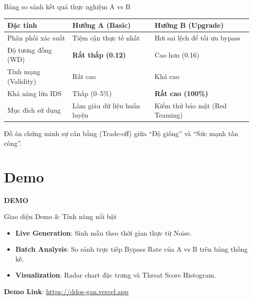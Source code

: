 \documentclass[aspectratio=169,11pt]{beamer}
\begin{document}
\begin{frame}{Bảng so sánh kết quả thực nghiệm A vs B}
  \centering \footnotesize
  \begin{tabular}{lll}
    \toprule
    \textbf{Đặc tính} &
    \textbf{Hướng A (Basic)} &
    \textbf{Hướng B (Upgrade)} \\
    \midrule
    Phân phối xác suất  & Tiệm cận thực tế nhất
                         & Hơi sai lệch để tối ưu bypass \\
    Độ tương đồng (WD)  & \textcolor{success}{\textbf{Rất thấp (0.12)}}
                         & Cao hơn (0.16) \\
    Tính mạng (Validity)& Rất cao     & Khá cao \\
    Khả năng lừa IDS    & Thấp (0--5\%)
                         & \textcolor{danger}{\textbf{Rất cao (100\%)}} \\
    Mục đích sử dụng    & Làm giàu dữ liệu huấn luyện
                         & Kiểm thử bảo mật (Red Teaming) \\
    \bottomrule
  \end{tabular}
  \vspace{10pt}
  \small Đồ án chứng minh sự cân bằng (Trade-off) giữa
  ``Độ giống'' và ``Sức mạnh tấn công''.
\end{frame}

\section{Demo}

\begin{frame}[plain]
  \vfill
  \centering
  \Huge \textbf{DEMO}
  \vfill
\end{frame}

\begin{frame}{Giao diện Demo \& Tính năng nổi bật}
  \begin{itemize}
    \item \textbf{Live Generation}: Sinh mẫu theo thời gian thực từ Noise.
    \item \textbf{Batch Analysis}: So sánh trực tiếp Bypass Rate của A vs B
          trên bảng thống kê.
    \item \textbf{Visualization}: Radar chart đặc trưng và Threat Score
          Histogram.
  \end{itemize}
  \vspace{10pt}
  \centering
  \textbf{Demo Link}: \url{https://ddos-gan.vercel.app}
\end{frame}
\end{document}
